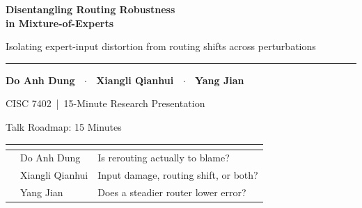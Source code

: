 \documentclass[aspectratio=169,11pt]{beamer}
\begin{document}
\begin{frame}[plain]
  \vspace{16mm}
  {\LARGE\bfseries\color{talknavy} Disentangling Routing Robustness\\[1.2mm] in Mixture-of-Experts\par}
  \vspace{3.5mm}
  {\large\color{talkmuted} Isolating expert-input distortion from routing shifts across perturbations\par}
  \vspace{6mm}
  {\color{talkorange}\rule{\textwidth}{1.15pt}}
  \vspace{3.5mm}
  {\large\bfseries Do Anh Dung \ {\color{talkmuted}$\cdot$} \ Xiangli Qianhui \ {\color{talkmuted}$\cdot$} \ Yang Jian\par}
  \vspace{7mm}
  {\color{talkmuted} CISC 7402 \,|\, 15-Minute Research Presentation}
\end{frame}

\begin{frame}{Talk Roadmap: 15 Minutes}
  \vspace{3mm}
  \renewcommand{\arraystretch}{1.55}
  \begin{tabular}{@{}>{\bfseries}p{2.7cm}p{3.6cm}p{7.2cm}@{}}
    \color{talkmuted}{Time} & \color{talkmuted}{Speaker} & \color{talkmuted}{Core Question} \\
    \midrule
    \rowcolor{talkcard}
    \color{talknavy}{0:00--5:00} & Do Anh Dung & Is rerouting actually to blame? \\
    \rowcolor{white}
    \color{talkorange}{5:00--10:00} & Xiangli Qianhui & Input damage, routing shift, or both? \\
    \rowcolor{talkcard}
    \color{talkgreen}{10:00--15:00} & Yang Jian & Does a steadier router lower error? \\
  \end{tabular}
\end{frame}
\end{document}
